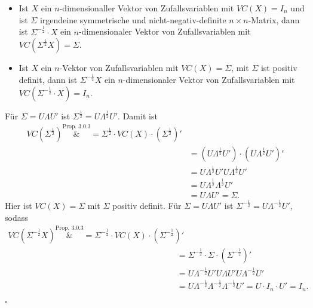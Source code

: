 \documentclass[10pt]{article}
\newcommand{\halb}{\frac{1}{2}} %
\newenvironment{BWS}[1][]
{\begin{Beweis}[frametitle=#1]}{\end{Beweis}}
\begin{document}
			\begin{Korollar}
				\begin{itemize}
					\item Ist $X$ ein $n$-dimensionaller Vektor von Zufallsvariablen mit $VC(X)=I_n$ und ist $\Sigma$ irgendeine symmetrische und nicht-negativ-definite $n\times n$-Matrix, dann ist $\Sigma^{-\halb} \cdot X$ ein $n$-dimensionaler Vektor von Zufallsvariablen mit $VC(\Sigma^{\halb} X) = \Sigma.$
					\item Ist $X$ ein $n$-Vektor von Zufallsvariablen mit $VC(X) = \Sigma$, mit $\Sigma$ ist positiv definit, dann ist $\Sigma^{-\halb}X$ ein $n$-dimensionaler Vektor von Zufallsvariablen mit $VC(\Sigma^{- \halb} \cdot X) = I_n$. 
				\end{itemize}
			\end{Korollar}
			\begin{BWS}[Beweis 3.1.2 (Eigenschaften von $\Sigma$)]
				Für $\Sigma = U \Lambda U'$ ist $\Sigma^{\halb} = U \Lambda^{\halb} U'$. Damit ist \begin{equation*}
					\begin{split}
						VC(\Sigma^{\halb}) \overset{\text{Prop. 3.0.3}}&{=} \Sigma^{\halb} \cdot VC(X) \cdot (\Sigma^{\halb})'\\
						&= (U \Lambda^{\halb} U') \cdot (U \Lambda^{\halb} U')'\\
						&= U \Lambda^{\halb} U'U \Lambda^{\halb} U'\\
						&= U \Lambda^{\halb} \Lambda^{\halb} U'\\
						&= U \Lambda U' = \Sigma.
					\end{split}
				\end{equation*}
				Hier ist $VC(X) = \Sigma$ mit $\Sigma$ positiv definit. Für $\Sigma = U \Lambda U'$ ist $\Sigma^{-\frac{1}{2}} = U \Lambda^{-\halb} U'$, sodass \begin{equation*}
					\begin{split}
						VC(\Sigma^{-\halb}X) \overset{\text{Prop. 3.0.3}}&{=} \Sigma^{-\halb} \cdot VC(X) \cdot (\Sigma^{-\halb})' \\
						&= \Sigma^{-\halb} \cdot \Sigma \cdot (\Sigma^{-\halb})'\\
						&= U \Lambda^{-\halb} U'U \Lambda U'U \Lambda^{-\halb} U'\\
						&= U \Lambda^{-\halb} \Lambda^{-\halb} \Lambda^{-\halb} U' = U \cdot I_n \cdot U' = I_n.
					\end{split}
				\end{equation*}
				\begin{flushright}
					$\square$
				\end{flushright}
			\end{BWS}
			
\end{document}
